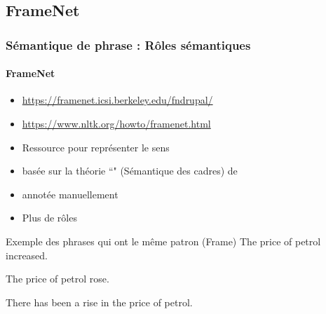 \documentclass[xcolor=table]{beamer}
\begin{document}
\subsection{FrameNet}

\begin{frame}
\frametitle{Sémantique de phrase : Rôles sémantiques}
\framesubtitle{FrameNet}

\begin{minipage}{.68\textwidth}
	\begin{itemize}
		\item {\scriptsize \url{https://framenet.icsi.berkeley.edu/fndrupal/}}
		\item {\scriptsize \url{https://www.nltk.org/howto/framenet.html}}
		\item Ressource pour représenter le sens 
		\item basée sur la théorie ``" (Sémantique des cadres) de 
		\item annotée manuellement
		\item Plus de rôles
	\end{itemize}
\end{minipage}
\begin{minipage}{.3\textwidth}
\end{minipage}

\begin{exampleblock}{Exemple des phrases qui ont le même patron (Frame)}
	The price of petrol increased.
	
	The price of petrol rose.
	
	There has been a rise in the price of petrol.
\end{exampleblock}

	
\end{frame}
\end{document}
